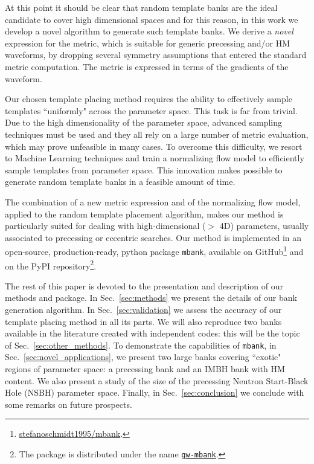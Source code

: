 \documentclass[twocolumn,showpacs,preprintnumbers,nofootinbib,prd,
superscriptaddress,10pt]{revtex4-2}
\begin{document}
At this point it should be clear that random template banks are the ideal candidate to cover high dimensional spaces and for this reason, in this work we develop a novel algorithm to generate such template banks.
We derive a {\it novel} expression for the metric, which is suitable for generic precessing and/or HM waveforms, by dropping several symmetry assumptions that entered the standard metric computation. The metric is expressed in terms of the gradients of the waveform.

Our chosen template placing method requires the ability to effectively sample templates ``uniformly" across the parameter space.
This task is far from trivial. Due to the high dimensionality of the parameter space, advanced sampling techniques must be used and they all rely on a large number of metric evaluation, which may prove unfeasible in many cases. To overcome this difficulty, we resort to Machine Learning techniques and train a normalizing flow model to efficiently sample templates from parameter space. This innovation makes possible to generate random template banks in a feasible amount of time.

The combination of a new metric expression and of the normalizing flow model, applied to the random template placement algorithm, makes our method is particularly suited for dealing with high-dimensional ($>$ 4D) parameters, usually associated to precessing or eccentric searches.
Our method is implemented in an open-source, production-ready, python package \texttt{mbank}, available on GitHub\footnote{
\href{https://github.com/stefanoschmidt1995/mbank}{stefanoschmidt1995/mbank}.}
and on the PyPI repository\footnote{
The package is distributed under the name \texttt{\href{https://pypi.org/project/gw-mbank/}{gw-mbank}}.
}.

The rest of this paper is devoted to the presentation and description of our methods and package.
In Sec.~\ref{sec:methods} we present the details of our bank generation algorithm.
In Sec.~\ref{sec:validation} we assess the accuracy of our template placing method in all its parts.
We will also reproduce two banks available in the literature \cite{Harry:2017weg, Sakon:2022ibh} created with independent codes: this will be the topic of Sec.~\ref{sec:other_methods}.
To demonstrate the capabilities of \texttt{mbank}, in Sec.~\ref{sec:novel_applications}, we present two large banks covering ``exotic" regions of parameter space: a precessing bank and an IMBH bank with HM content. We also present a study of the size of the precessing Neutron Start-Black Hole (NSBH) parameter space.
Finally, in Sec.~\ref{sec:conclusion} we conclude with some remarks on future prospects.
\end{document}
